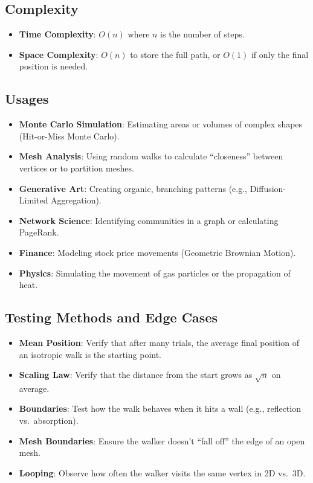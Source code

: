 \subsection{Complexity}
\begin{itemize}
    \item \textbf{Time Complexity}: $O(n)$ where $n$ is the number of steps.
    \item \textbf{Space Complexity}: $O(n)$ to store the full path, or $O(1)$ if only the final position is needed.
\end{itemize}

\subsection{Usages}
\begin{itemize}
    \item \textbf{Monte Carlo Simulation}: Estimating areas or volumes of complex shapes (Hit-or-Miss Monte Carlo).
    \item \textbf{Mesh Analysis}: Using random walks to calculate ``closeness'' between vertices or to partition meshes.
    \item \textbf{Generative Art}: Creating organic, branching patterns (e.g., Diffusion-Limited Aggregation).
    \item \textbf{Network Science}: Identifying communities in a graph or calculating PageRank.
    \item \textbf{Finance}: Modeling stock price movements (Geometric Brownian Motion).
    \item \textbf{Physics}: Simulating the movement of gas particles or the propagation of heat.
\end{itemize}

\subsection{Testing Methods and Edge Cases}
\begin{itemize}
    \item \textbf{Mean Position}: Verify that after many trials, the average final position of an isotropic walk is the starting point.
    \item \textbf{Scaling Law}: Verify that the distance from the start grows as $\sqrt{n}$ on average.
    \item \textbf{Boundaries}: Test how the walk behaves when it hits a wall (e.g., reflection vs.\ absorption).
    \item \textbf{Mesh Boundaries}: Ensure the walker doesn't ``fall off'' the edge of an open mesh.
    \item \textbf{Looping}: Observe how often the walker visits the same vertex in 2D vs.\ 3D.
\end{itemize}

